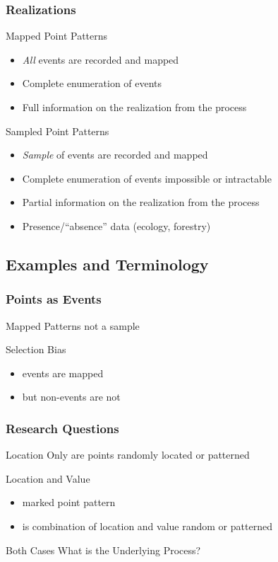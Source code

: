 \documentclass[nototal]{beamer}
\begin{document}
\begin{frame}[<+->]
   \frametitle{Realizations}
\begin{block}{Mapped Point Patterns}
    \begin{itemize}
      \item \emph{All} events are recorded and mapped
      \item Complete enumeration of events
      \item Full information on the realization from the process
    \end{itemize}
   \end{block}
 \begin{block}{Sampled Point Patterns}
    \begin{itemize}
      \item \emph{Sample} of events are recorded and mapped
      \item Complete enumeration of events impossible or intractable
      \item Partial information on the realization from the process
      \item Presence/``absence'' data (ecology, forestry)
    \end{itemize}
   \end{block}

 \end{frame}

\subsection{Examples and Terminology}

\begin{frame}
  \frametitle{Points as Events}
  \begin{block}{Mapped Patterns}
     not a sample
   \end{block}
  \begin{block}{Selection Bias}
    \begin{itemize}
      \item events are mapped
	\item but non-events are not
    \end{itemize}
   \end{block}

 \end{frame}

 \begin{frame}
   \frametitle{Research Questions}
   \begin{block}{Location Only}
      are points randomly located or patterned
    \end{block}
   \begin{block}{Location and Value}
     \begin{itemize}
       \item marked point pattern
       \item is combination of location and value random or patterned
     \end{itemize}
    \end{block}
   \begin{block}{Both Cases}
    What is the Underlying Process?
    \end{block}
  \end{frame}
\end{document}
